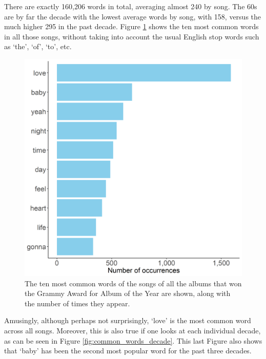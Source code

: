 \documentclass{article}
\begin{document}
\newpage

There are exactly 160,206 words in total, averaging almost 240 by song. The 60s are by far the decade with the lowest average words by song, with 158, versus the much higher 295 in the past decade. Figure \ref{fig:common_words} shows the ten most common words in all those songs, without taking into account the usual English stop words such as `the', `of', `to', etc. 


\begin{figure}[h]
    \centering
    \includegraphics[scale=0.45]{Plots/graph_common_words.png}
    \caption{The ten most common words of the songs of all the albums that won the Grammy Award for Album of the Year are shown, along with the number of times they appear.}
    \label{fig:common_words}
\end{figure}



Amusingly, although perhaps not surprisingly, `love' is the most common word across all songs. Moreover, this is also true if one looks at each individual decade, as can be seen in Figure \ref{fig:common_words_decade}. This last Figure also shows that `baby' has been the second most popular word for the past three decades.


\end{document}
